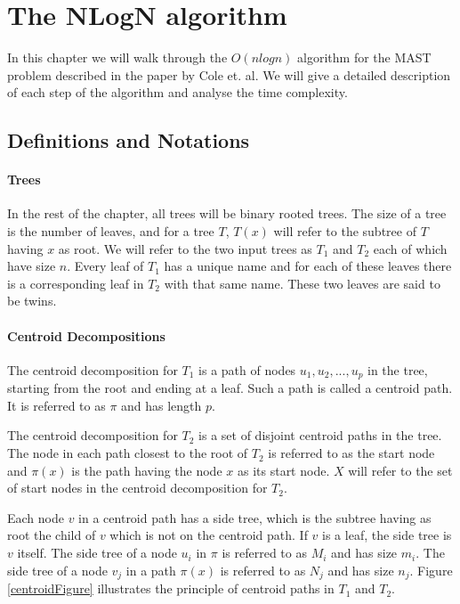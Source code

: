 \chapter{The NLogN algorithm}
In this chapter we will walk through the $O(nlogn)$ algorithm for the MAST problem described in the paper \cite{nlogn} by Cole et. al. We will give a detailed description of each step of the algorithm and analyse the time complexity.

\section{Definitions and Notations}
\subsubsection{Trees}
In the rest of the chapter, all trees will be binary rooted trees. The size of a tree is the number of leaves, and for a tree $T$, $T(x)$ will refer to the subtree of $T$ having $x$ as root. We will refer to the two input trees as $T_1$ and $T_2$ each of which have size $n$. Every leaf of $T_1$ has a unique name and for each of these leaves there is a corresponding leaf in $T_2$ with that same name. These two leaves are said to be twins.

\subsubsection{Centroid Decompositions}
The centroid decomposition for $T_1$ is a path of nodes $u_1, u_2, ..., u_p$ in the tree, starting from the root and ending at a leaf. Such a path is called a centroid path. It is referred to as $\pi$ and has length $p$.

The centroid decomposition for $T_2$ is a set of disjoint centroid paths in the tree. The node in each path closest to the root of $T_2$ is referred to as the start node and $\pi(x)$ is the path having the node $x$ as its start node. $X$ will refer to the set of start nodes in the centroid decomposition for $T_2$.

Each node $v$ in a centroid path has a side tree, which is the subtree having as root the child of $v$ which is not on the centroid path. If $v$ is a leaf, the side tree is $v$ itself. The side tree of a node $u_i$ in $\pi$ is referred to as $M_i$ and has size $m_i$. The side tree of a node $v_j$ in a path $\pi(x)$ is referred to as $N_j$ and has size $n_j$. Figure \ref{centroidFigure} illustrates the principle of centroid paths in $T_1$ and $T_2$.

